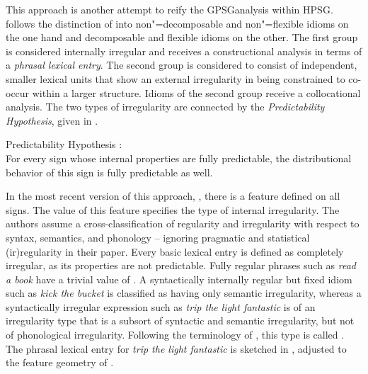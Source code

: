 \documentclass[output=paper
 	        ,biblatex
                ,babelshorthands
                ,newtxmath
                ,draftmode
                ,colorlinks, citecolor=brown
]{langscibook}
\begin{document}
This approach is another attempt to reify the GPSG\indexgpsg analysis
within HPSG.  \citet{Sailer2000a} follows the distinction of \citet{NSW94a} into non"=decomposable
and non"=flexible idioms on the one hand and decomposable and flexible idioms on the other. The
first group is considered internally irregular and receives a constructional analysis in terms of a
\emph{phrasal lexical entry}. The second group is considered to consist of
independent, smaller lexical units that show an external irregularity in being constrained to
co-occur within a larger structure.  Idioms of the second group receive a collocational
analysis. The two types of irregularity are connected by the \emph{Predictability Hypothesis}, given
in .

\vbox{
\eanoraggedright 
\label{PredHypo}
Predictability Hypothesis \citep[]{Sailer2000a}:\\
For every sign whose internal properties are fully predictable, the distributional
behavior of this sign is fully predictable as well.
\z 
}

\noindent
In the most recent version of this approach, \citet{Richter:Sailer:09,Richter:Sailer:14}, there is a
feature  defined on all signs. The value of this feature specifies the type of internal
irregularity.  The authors assume a cross-classification of regularity and irregularity with respect
to syntax, semantics, and phonology -- ignoring pragmatic and statistical (ir)regularity in their
paper.  Every basic lexical entry is defined as completely irregular, as its properties are not
predictable.  Fully regular phrases such as \emph{read a book} have a trivial value of .
A syntactically internally regular but fixed idiom such as \emph{kick the bucket} is classified as
having only semantic irregularity, whereas a syntactically irregular expression such as \emph{trip
  the light fantastic} is of an irregularity type that is a subsort of syntactic and semantic
irregularity, but not of phonological irregularity.  Following the terminology of \citet{FKoC88a},
this type is called .
%
The phrasal lexical entry for \emph{trip the light fantastic} is sketched in ,
adjusted to the feature geometry of \citet{Sag97a}.
\end{document}
